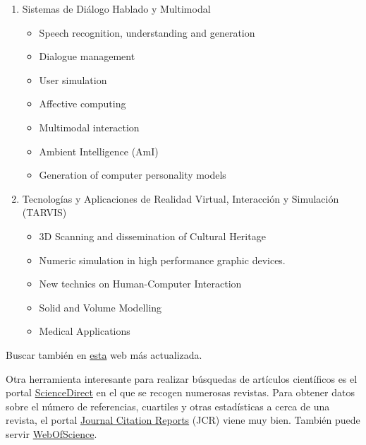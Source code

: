 {{\begin{enumerate}[itemsep=0mm]
\begin{itemize}[nosep]
            \item Métodos formales en sistemas concurrentes
            \item Computación de tiempo real y empotrada para sistemas ubicuos y de inteligencia ambiental
            \item Middlewares y marcos de desarrollo para sistemas empotrados de tiempo real distribuidos
            \item Sistemas de medición distribuido y de instrumentación 
        \end{itemize} 
        \item Sistemas de Diálogo Hablado y Multimodal
        \begin{itemize}[nosep]
            \item Speech recognition, understanding and generation
            \item Dialogue management
            \item User simulation
            \item Affective computing
            \item Multimodal interaction
            \item Ambient Intelligence (AmI)
            \item Generation of computer personality models
        \end{itemize}
        \item Tecnologías y Aplicaciones de Realidad Virtual, Interacción y Simulación (TARVIS)
        \begin{itemize}[nosep]
            \item 3D Scanning and dissemination of Cultural Heritage
            \item Numeric simulation in high performance graphic devices.
            \item New technics on Human-Computer Interaction
            \item Solid and Volume Modelling
            \item Medical Applications
        \end{itemize}
    \end{enumerate}
    }

    Buscar también en \href{https://www.aepia.org/grupos-de-investigacion/}{esta} web más actualizada.
}

Otra herramienta interesante para realizar búsquedas de artículos científicos es el portal \href{https://www.sciencedirect.com/}{ScienceDirect} en el que se recogen numerosas revistas. Para obtener datos sobre el número de referencias, cuartiles y otras estadísticas a cerca de una revista, el portal \href{https://jcr.clarivate.com/jcr/home?app=jcr&Init=Yes&authCode=null&SrcApp=IC2LS}{Journal Citation Reports} (JCR) viene muy bien. También puede servir \href{https://www.webofscience.com/wos/alldb/basic-search}{WebOfScience}.


